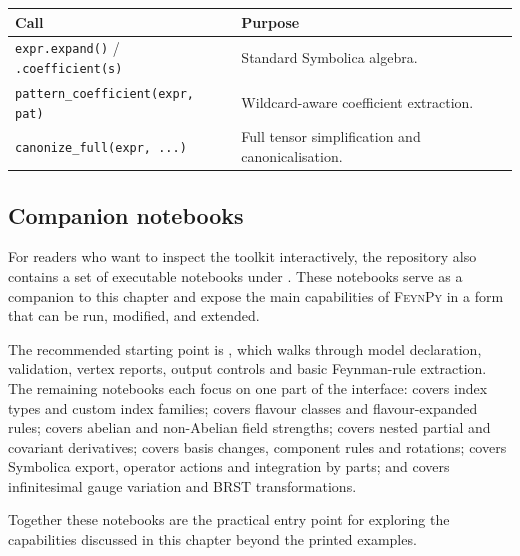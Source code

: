 \begin{center}
\begin{tabular}{@{}P{5.4cm}p{7cm}@{}}
\toprule
\normalfont\textbf{Call} & \textbf{Purpose} \\
\midrule
\texttt{expr.expand()} / \texttt{.coefficient(s)} & Standard Symbolica algebra. \\
\texttt{pattern\_coefficient(expr, pat)} & Wildcard-aware coefficient extraction. \\
\texttt{canonize\_full(expr, ...)} & Full tensor simplification and canonicalisation. \\
\bottomrule
\end{tabular}
\end{center}

\subsection*{Companion notebooks}

For readers who want to inspect the toolkit interactively, the repository also
contains a set of executable notebooks under . These notebooks
serve as a companion to this chapter and expose the main capabilities of
\textsc{FeynPy} in a form that can be run, modified, and extended.

The recommended starting point is , which
walks through model declaration, validation, vertex reports, output controls and
basic Feynman-rule extraction. The remaining notebooks each focus on one part
of the interface:  covers index types and custom
index families;  covers flavour classes and
flavour-expanded rules;  covers abelian
and non-Abelian field strengths; 
covers nested partial and covariant derivatives;
 covers basis changes, component
rules and rotations;  covers
Symbolica export, operator actions and integration by parts; and
 covers infinitesimal gauge variation and
BRST transformations.

Together these notebooks are the practical entry point for exploring the
capabilities discussed in this chapter beyond the printed examples.
